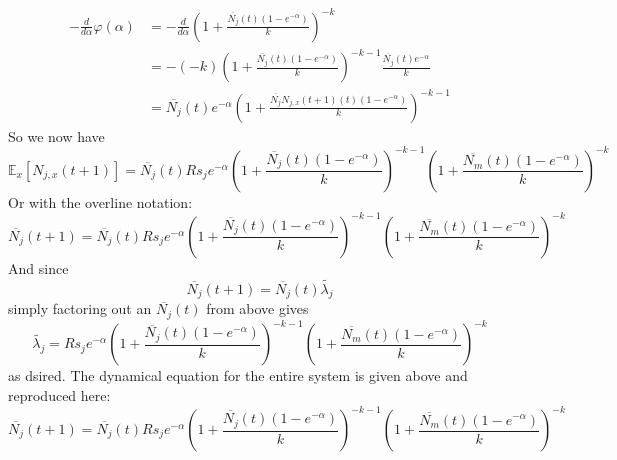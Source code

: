 \documentclass[11pt]{amsart}
\newcommand\Ex[0]{\mathbb{E}_x}
\begin{document}
\begin{align*}
-\frac{d}{d\alpha}\varphi(\alpha)&=-\frac{d}{d\alpha}\left(1+\frac{\overline{N_{j}}(t)(1-e^{-\alpha})}{k}\right)^{-k}\\
&=-(-k)\left(1+\frac{\overline{N_{j}}(t)(1-e^{-\alpha})}{k}\right)^{-k-1}\frac{\overline{N_j}(t)e^{-\alpha}}{k}\\
&=\overline{N_j}(t)e^{-\alpha}\left(1+\frac{\overline{N_{j}}N_{j,x}(t+1)(t)(1-e^{-\alpha})}{k}\right)^{-k-1}
\end{align*}
So we now have
\[
\Ex[N_{j,x}(t+1)]=\overline{N_j}(t)Rs_je^{-\alpha}\left(1+\frac{\overline{N_{j}}(t)(1-e^{-\alpha})}{k}\right)^{-k-1}\left(1+\frac{\overline{N_m}(t)(1-e^{-\alpha})}{k}\right)^{-k}
\]
Or with the overline notation:
\[
\overline{N_{j}}(t+1)=\overline{N_j}(t)Rs_je^{-\alpha}\left(1+\frac{\overline{N_j}(t)(1-e^{-\alpha})}{k}\right)^{-k-1}\left(1+\frac{\overline{N_m}(t)(1-e^{-\alpha})}{k}\right)^{-k}
\]
And since
\[
\overline{N_{j}}(t+1)=\overline{N_j}(t)\widetilde{\lambda_j}
\]
simply factoring out an $\overline{N_j}(t)$ from above gives
\[
\widetilde{\lambda_j} = Rs_je^{-\alpha}\left(1+\frac{\overline{N_{j}}(t)(1-e^{-\alpha})}{k}\right)^{-k-1}\left(1+\frac{\overline{N_m}(t)(1-e^{-\alpha})}{k}\right)^{-k}
\]
as dsired.
The dynamical equation for the entire system is given above and reproduced here:
\[
\overline{N_{j}}(t+1)=\overline{N_j}(t)Rs_je^{-\alpha}\left(1+\frac{\overline{N_{j}}(t)(1-e^{-\alpha})}{k}\right)^{-k-1}\left(1+\frac{\overline{N_m}(t)(1-e^{-\alpha})}{k}\right)^{-k}
\]
\end{document}
